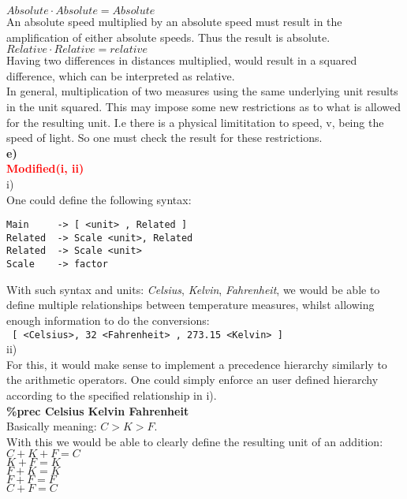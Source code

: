$Absolute \cdot Absolute = Absolute$\\
An absolute speed multiplied by an absolute speed must result in the amplification of either absolute speeds. Thus the result is absolute.\\

$Relative \cdot Relative = relative$\\
Having two differences in distances multiplied, would result in a squared difference, which can be interpreted as relative.\\

In general, multiplication of two measures using the same underlying unit results in the unit squared. This may impose some new restrictions as to what is allowed for the resulting unit. I.e there is a physical limititation to speed, v, being the speed of light. So one must check the result for these restrictions.\\

\textbf{e)}\\
\textcolor{red}{\textbf{Modified(i, ii)}}\\
i)\\
One could define the following syntax:
\begin{lstlisting}
Main     -> [ <unit> , Related ]
Related  -> Scale <unit>, Related
Related  -> Scale <unit>
Scale    -> factor
\end{lstlisting}
With such syntax and units: \textit{Celsius}, \textit{Kelvin}, \textit{Fahrenheit}, we would be able to define multiple relationships between temperature measures, whilst allowing enough information to do the conversions:\\
\texttt{ [ <Celsius>, 32 <Fahrenheit> , 273.15 <Kelvin> ]} \\

ii)\\
For this, it would make sense to implement a precedence hierarchy similarly to the arithmetic operators. One could simply enforce an user defined hierarchy according to the specified relationship in i).\\
\textbf{\%prec Celsius Kelvin Fahrenheit}\\
Basically meaning: $C > K > F$. \\
With this we would be able to clearly define the resulting unit of an addition:\\
\tab$C + K + F = C$ \\
\tab$K + F = K$ \\
\tab$F + K = K$ \\
\tab$F + F =F$ \\
\tab$C+ F =C$ \\
